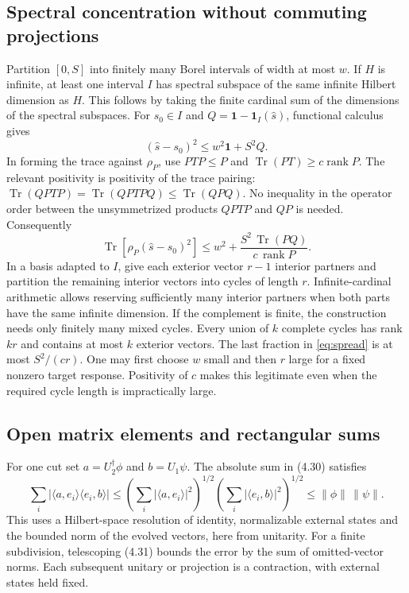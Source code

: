 \documentclass[11pt]{article}
\newcommand{\Tr}{\operatorname{Tr}}
\newcommand{\id}{\mathbf{1}}
\newcommand{\areaop}{\hat s}
\DeclareMathOperator{\rank}{rank}
\begin{document}
\subsection{Spectral concentration without commuting projections}
Partition $[0,S]$ into finitely many Borel intervals of width at most $w$. If $H$ is infinite, at least one interval $I$ has spectral subspace of the same infinite Hilbert dimension as $H$. This follows by taking the finite cardinal sum of the dimensions of the spectral subspaces. For $s_0\in I$ and $Q=\id-\id_I(\areaop)$, functional calculus gives
\[
 (\areaop-s_0)^2\le w^2\id+S^2 Q .
\]
In forming the trace against $\rho_P$, use $PTP\le P$ and $\Tr(PT)\ge c\rank P$. The relevant positivity is positivity of the trace pairing: $\Tr(QPTP)=\Tr(QPTPQ)\le\Tr(QPQ)$. No inequality in the operator order between the unsymmetrized products $QPTP$ and $QP$ is needed. Consequently
\begin{equation}\label{eq:spread}
 \Tr[\rho_P(\areaop-s_0)^2]\le
 w^2+\frac{S^2\,\Tr(PQ)}{c\,\rank P}.
\end{equation}
In a basis adapted to $I$, give each exterior vector $r-1$ interior partners and partition the remaining interior vectors into cycles of length $r$. Infinite-cardinal arithmetic allows reserving sufficiently many interior partners when both parts have the same infinite dimension. If the complement is finite, the construction needs only finitely many mixed cycles. Every union of $k$ complete cycles has rank $kr$ and contains at most $k$ exterior vectors. The last fraction in \eqref{eq:spread} is at most $S^2/(cr)$. One may first choose $w$ small and then $r$ large for a fixed nonzero target response. Positivity of $c$ makes this legitimate even when the required cycle length is impractically large.

\subsection{Open matrix elements and rectangular sums}
For one cut set $a=U_2^\dagger\phi$ and $b=U_1\psi$. The absolute sum in (4.30) satisfies
\[
 \sum_i|\langle a,e_i\rangle\langle e_i,b\rangle|
 \le \left(\sum_i|\langle a,e_i\rangle|^2\right)^{1/2}
       \left(\sum_i|\langle e_i,b\rangle|^2\right)^{1/2}
 \le\|\phi\|\,\|\psi\| .
\]
This uses a Hilbert-space resolution of identity, normalizable external states and the bounded norm of the evolved vectors, here from unitarity. For a finite subdivision, telescoping (4.31) bounds the error by the sum of omitted-vector norms. Each subsequent unitary or projection is a contraction, with external states held fixed.
\end{document}
